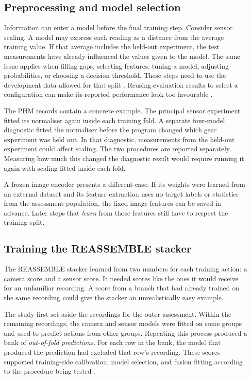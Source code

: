 \subsection{Preprocessing and model selection}

Information can enter a model before the final training step. Consider sensor scaling. A
model may express each reading as a distance from the average training value. If that
average includes the held-out experiment, the test measurements have already influenced
the values given to the model. The same issue applies when filling gaps, selecting
features, tuning a model, adjusting probabilities, or choosing a decision threshold.
These steps need to use the development data allowed for that split \parencite{P017}.
Reusing evaluation results to select a configuration can make its reported performance
look too favourable \parencite{P004}.

The PHM records contain a concrete example. The principal sensor experiment fitted its
normaliser again inside each training fold. A separate four-model diagnostic fitted the
normaliser before the program changed which gear experiment was held out. In that
diagnostic, measurements from the held-out experiment could affect scaling. The two
procedures are reported separately. Measuring how much this changed the diagnostic
result would require running it again with scaling fitted inside each fold.

A frozen image encoder presents a different case. If its weights were learned from an
external dataset and its feature extraction uses no target labels or statistics from the
assessment population, the fixed image features can be saved in advance. Later steps
that \emph{learn} from those features still have to respect the training split.

\subsection{Training the REASSEMBLE stacker}

The REASSEMBLE stacker learned from two numbers for each training action: a camera score
and a sensor score. It needed scores like the ones it would receive for an unfamiliar
recording. A score from a branch that had already trained on the same recording could
give the stacker an unrealistically easy example.

The study first set aside the recordings for the outer assessment. Within the remaining
recordings, the camera and sensor models were fitted on some groups and used to predict
actions from other groups. Repeating this process produced a bank of \emph{out-of-fold
predictions}. For each row in the bank, the model that produced the prediction had
excluded that row’s recording. These scores supported training-side calibration, model
selection, and fusion fitting according to the procedure being tested
\parencite{Ting1999Issues}.

